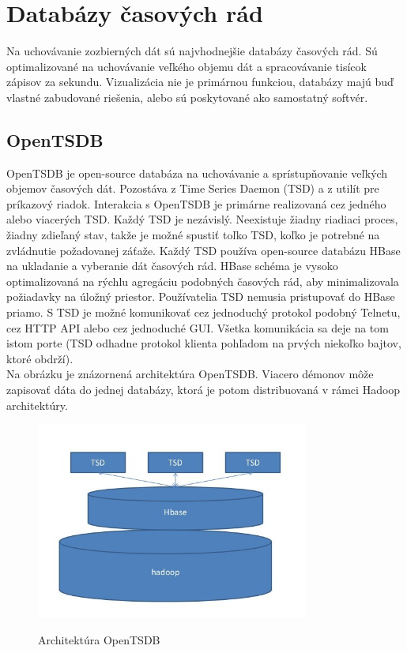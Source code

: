 \documentclass[printed,11pt,twoside,color,cover,table]{fithesis3}
\begin{document}
\section{Databázy časových rád}
Na uchovávanie zozbierných dát sú najvhodnejšie databázy časových rád. Sú optimalizované na uchovávanie veľkého objemu dát a spracovávanie tisícok zápisov za sekundu. Vizualizácia nie je primárnou funkciou,
databázy majú buď vlastné zabudované riešenia, alebo sú poskytované ako samostatný softvér.

\subsection{OpenTSDB}
OpenTSDB je open-source databáza na uchovávanie a sprístupňovanie veľkých objemov časových dát. Pozostáva z Time Series Daemon (TSD) a z utilít pre príkazový riadok. Interakcia s OpenTSDB je primárne realizovaná cez jedného alebo viacerých TSD. Každý TSD je nezávislý.
Neexistuje žiadny riadiaci proces, žiadny zdieľaný stav, takže je možné spustiť toľko TSD, koľko je potrebné na zvládnutie požadovanej záťaže. Každý TSD používa open-source databázu HBase
na ukladanie a vyberanie dát časových rád. HBase schéma je vysoko optimalizovaná na rýchlu agregáciu podobných časových rád, aby minimalizovala požiadavky na úložný priestor. 
Používatelia TSD nemusia pristupovať do HBase priamo. S TSD je možné komunikovať cez jednoduchý protokol podobný Telnetu, cez HTTP API alebo cez jednoduché GUI. Všetka komunikácia
sa deje na tom istom porte (TSD odhadne protokol klienta pohľadom na prvých niekoľko bajtov, ktoré obdrží).\cite{openTSDB}
\\Na obrázku je znázornená architektúra OpenTSDB. Viacero démonov môže zapisovať dáta do jednej databázy, ktorá je potom distribuovaná v rámci Hadoop architektúry.
\begin{figure}[h]
\begin{center}
       \includegraphics[width=0.8\textwidth]{images/opentsdb-arch.jpg}
       \caption{Architektúra OpenTSDB}\cite{opentsdb-arch}
\end{center}
\end{figure}
\end{document}
